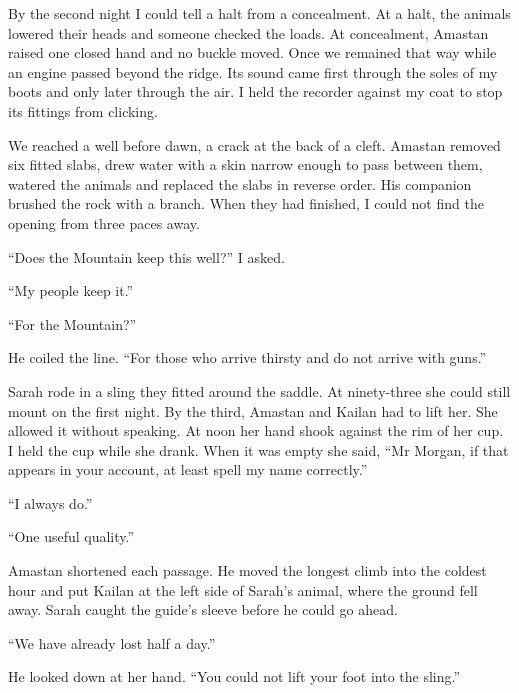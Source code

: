 By the second night I could tell a halt from a concealment. At a halt, the animals lowered their heads and someone checked the loads. At concealment, Amastan raised one closed hand and no buckle moved. Once we remained that way while an engine passed beyond the ridge. Its sound came first through the soles of my boots and only later through the air. I held the recorder against my coat to stop its fittings from clicking.\par

We reached a well before dawn, a crack at the back of a cleft. Amastan removed six fitted slabs, drew water with a skin narrow enough to pass between them, watered the animals and replaced the slabs in reverse order. His companion brushed the rock with a branch. When they had finished, I could not find the opening from three paces away.\par

``Does the Mountain keep this well?'' I asked.\par

``My people keep it.''\par

``For the Mountain?''\par

He coiled the line. ``For those who arrive thirsty and do not arrive with guns.''\par

Sarah rode in a sling they fitted around the saddle. At ninety-three she could still mount on the first night. By the third, Amastan and Kailan had to lift her. She allowed it without speaking. At noon her hand shook against the rim of her cup. I held the cup while she drank. When it was empty she said, ``Mr Morgan, if that appears in your account, at least spell my name correctly.''\par

``I always do.''\par

``One useful quality.''\par

Amastan shortened each passage. He moved the longest climb into the coldest hour and put Kailan at the left side of Sarah's animal, where the ground fell away. Sarah caught the guide's sleeve before he could go ahead.\par

``We have already lost half a day.''\par

He looked down at her hand. ``You could not lift your foot into the sling.''\par

